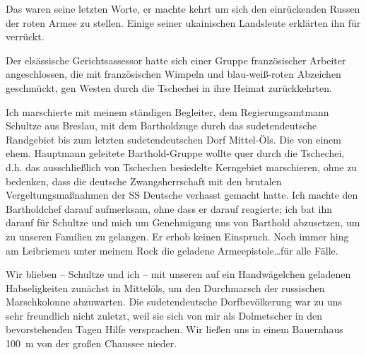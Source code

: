 Das waren seine letzten Worte, er machte kehrt um sich den einrückenden Russen der roten Armee zu stellen. Einige seiner ukainischen Landsleute erklärten ihn für verrückt.

Der elsässische Gerichtsassessor hatte sich einer Gruppe französischer Arbeiter angeschlossen, die mit französischen Wimpeln und blau-weiß-roten Abzeichen geschmückt, gen Westen durch die Tschechei in ihre Heimat zurückkehrten.

Ich marschierte mit meinem ständigen Begleiter, dem Regierungsamtmann Schultze aus Breslau, mit dem Bartholdzuge durch das sudetendeutsche Randgebiet bis zum letzten sudetendeutschen Dorf Mittel-Öls. Die von einem ehem. Hauptmann geleitete  Barthold-Gruppe wollte quer durch die Tschechei, d.h. das ausschließlich von Tschechen besiedelte Kerngebiet marschieren, ohne zu bedenken, dass die deutsche Zwangsherrschaft mit den brutalen Vergeltungsmaßnahmen der SS Deutsche verhasst gemacht hatte. Ich machte den Bartholdchef darauf aufmerksam, ohne dass er darauf reagierte; ich bat ihn darauf für Schultze und mich um Genehmigung uns von Barthold abzusetzen, um zu unseren Familien zu gelangen. Er erhob keinen Einspruch. Noch immer hing am Leibriemen unter meinem Rock die geladene Armeepistole\dots für alle Fälle.

Wir blieben -- Schultze und ich -- mit unseren auf ein Handwägelchen geladenen Habseligkeiten zunächst in Mittelöls, um den Durchmarsch der russischen Marschkolonne abzuwarten. Die sudetendeutsche Dorfbevölkerung war zu uns sehr freundlich nicht zuletzt, weil sie sich von mir als Dolmetscher in den bevorstehenden Tagen Hilfe versprachen. Wir ließen uns in einem Bauernhaus 100~m von der großen Chaussee nieder.

